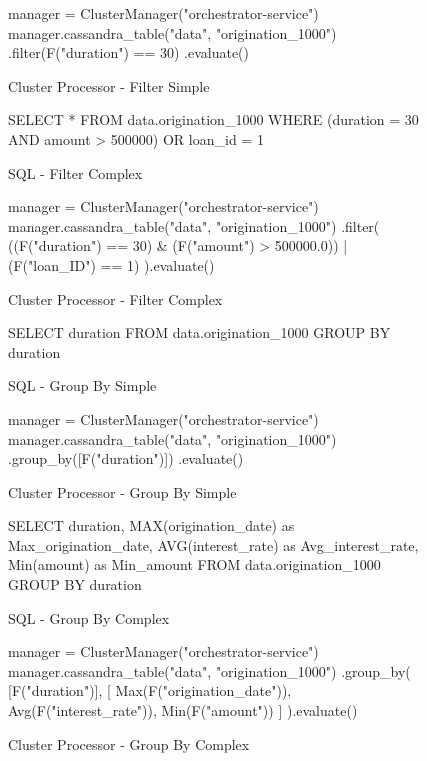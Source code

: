 \begin{figure}[h]	
	\begin{python}
manager = ClusterManager("orchestrator-service")
manager.cassandra_table("data", "origination_1000")
.filter(F("duration") == 30)
.evaluate()
	\end{python}
	\caption{Cluster Processor - Filter Simple}
	\label{fig:cluster-filter-simple}
\end{figure}

\begin{figure}[h]
	\centering
	\begin{SQL}
SELECT *
FROM data.origination_1000
WHERE 
(duration = 30 AND amount > 500000)
OR loan_id = 1
	\end{SQL}
	\caption{SQL - Filter Complex}
	\label{fig:sql-filter-complex}
\end{figure}
	
\begin{figure}[h]
	\begin{python}
manager = ClusterManager("orchestrator-service")
manager.cassandra_table("data", "origination_1000")
.filter(
((F("duration") == 30) & (F("amount") > 500000.0))
| (F("loan_ID") == 1)
).evaluate()
	\end{python}
	\caption{Cluster Processor - Filter Complex}
	\label{fig:cluster-filter-complex}
\end{figure}

\begin{figure}[h]
	\centering
	\begin{SQL}
		SELECT duration
		FROM data.origination_1000
		GROUP BY duration
	\end{SQL}
	\caption{SQL - Group By Simple}
	\label{fig:sql-group-by-simple}
\end{figure}

\begin{figure}[h]
	\begin{python}
manager = ClusterManager("orchestrator-service")
manager.cassandra_table("data", "origination_1000")
.group_by([F("duration")])
.evaluate()
	\end{python}
	\caption{Cluster Processor - Group By Simple}
	\label{fig:cluster-group-by-simple}
\end{figure}

\begin{figure}[h]
	\centering
	\begin{SQL}
SELECT 
duration, 
MAX(origination_date) as Max_origination_date, 
AVG(interest_rate) as Avg_interest_rate, 
Min(amount) as Min_amount 
FROM data.origination_1000 
GROUP BY duration
	\end{SQL}
	\caption{SQL - Group By Complex}
	\label{fig:sql-group-by-complex}
\end{figure}

\begin{figure}[h]
	\begin{python}
manager = ClusterManager("orchestrator-service")
manager.cassandra_table("data", "origination_1000")
.group_by(
[F("duration")],
[	Max(F("origination_date")), 
Avg(F("interest_rate")), 
Min(F("amount"))
]
).evaluate()
	\end{python}
	\caption{Cluster Processor - Group By Complex}
	\label{fig:cluster-group-by-complex}
\end{figure}